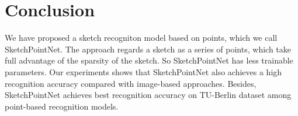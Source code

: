 \section{Conclusion}
\label{sec:conclusion}

We have proposed a sketch recogniton model based on points, which we call SketchPointNet. The approach regards a sketch as a series of points, which take full advantage of the sparsity of the sketch. So SketchPointNet has less trainable parameters. Our experiments shows that SketchPointNet also achieves a high recognition accuracy compared with image-based approaches. Besides, SketchPointNet achieves best recognition accuracy on TU-Berlin dataset among point-based recognition models.
